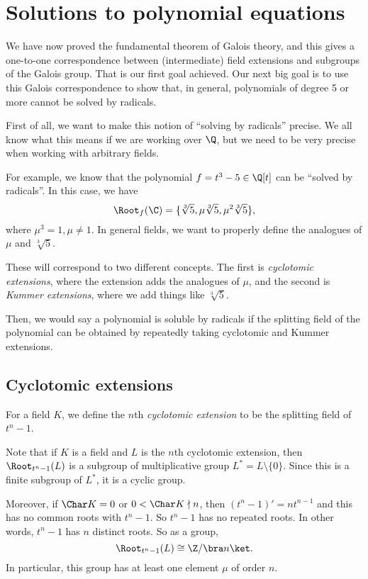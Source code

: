 \documentclass[a4paper]{article}
\begin{document}
\section{Solutions to polynomial equations}
We have now proved the fundamental theorem of Galois theory, and this gives a one-to-one correspondence between (intermediate) field extensions and subgroups of the Galois group. That is our first goal achieved. Our next big goal is to use this Galois correspondence to show that, in general, polynomials of degree 5 or more cannot be solved by radicals.

First of all, we want to make this notion of ``solving by radicals'' precise. We all know what this means if we are working over $\Q$, but we need to be very precise when working with arbitrary fields.

For example, we know that the polynomial $f = t^3 - 5 \in \Q[t]$ can be ``solved by radicals''. In this case, we have
\[
  \Root_f(\C) = \{\sqrt[3]{5}, \mu \sqrt[3]{5}, \mu^2\sqrt[3]{5}\},
\]
where $\mu^3 = 1, \mu \not= 1$. In general fields, we want to properly define the analogues of $\mu$ and $\sqrt[3]{5}$.

These will correspond to two different concepts. The first is \emph{cyclotomic extensions}, where the extension adds the analogues of $\mu$, and the second is \emph{Kummer extensions}, where we add things like $\sqrt[3]{5}$.

Then, we would say a polynomial is soluble by radicals if the splitting field of the polynomial can be obtained by repeatedly taking cyclotomic and Kummer extensions.

\subsection{Cyclotomic extensions}
\begin{defi}
  For a field $K$, we define the $n$th \emph{cyclotomic extension} to be the splitting field of $t^n - 1$.
\end{defi}
Note that if $K$ is a field and $L$ is the $n$th cyclotomic extension, then $\Root_{t^n - 1}(L)$ is a subgroup of multiplicative group $L^* = L\setminus \{0\}$. Since this is a finite subgroup of $L^*$, it is a cyclic group.

Moreover, if $\Char K = 0$ or $0 < \Char K \nmid n$, then $(t^n - 1)' = nt^{n - 1}$ and this has no common roots with $t^n - 1$. So $t^n - 1$ has no repeated roots. In other words, $t^n - 1$ has $n$ distinct roots. So as a group,
\[
  \Root_{t^n - 1}(L) \cong \Z/\bra n\ket.
\]
In particular, this group has at least one element $\mu$ of order $n$.
\end{document}
